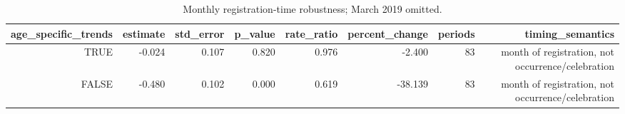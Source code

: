 \begin{table}[!htbp]
\centering
\caption{Monthly registration-time robustness; March 2019 omitted.} 
\label{tab:monthly_registry}
\begingroup\small
\begin{tabular}{rrrrrrrr}
  \hline
age\_specific\_trends & estimate & std\_error & p\_value & rate\_ratio & percent\_change & periods & timing\_semantics \\ 
  \hline
TRUE & -0.024 & 0.107 & 0.820 & 0.976 & -2.400 &   83 & month of registration, not occurrence/celebration \\ 
  FALSE & -0.480 & 0.102 & 0.000 & 0.619 & -38.139 &   83 & month of registration, not occurrence/celebration \\ 
   \hline
\end{tabular}
\endgroup
\end{table}
